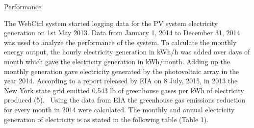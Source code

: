 \documentclass[12pt]{article}
\begin{document}
\vspace{\baselineskip}
\begin{justify}
\uline{Performance}
\end{justify}\par

\begin{justify}
The WebCtrl system started logging data for the PV system electricity generation on 1st May 2013. Data from January 1, 2014 to December 31, 2014 was used to analyze the performance of the system. To calculate the monthly energy output, the hourly electricity generation in kWh/h was added over days of month which gave the electricity generation in kWh/month. Adding up the monthly generation gave electricity generated by the photovoltaic array in the year 2014. According to a report released by EIA on 8 July, 2015, in 2013 the New York state grid emitted 0.543 lb of greenhouse gases per kWh of electricity produced (5).  Using the data from EIA the greenhouse gas emissions reduction for every month in 2014 were calculated. The monthly and annual electricity generation of electricity is as stated in the following table (Table 1). 
\end{justify}\par


\vspace{\baselineskip}
\par



\end{document}
